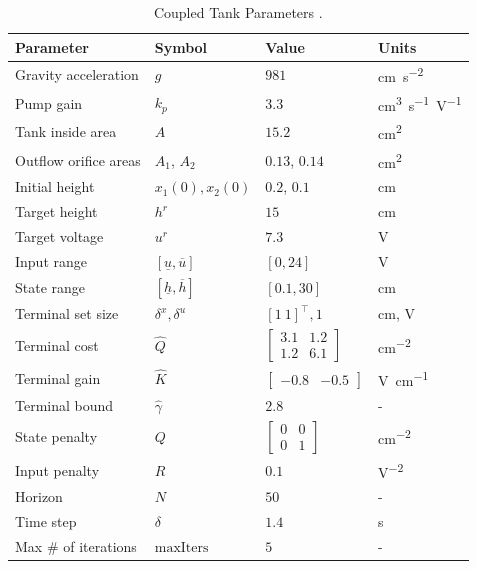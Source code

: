 \documentclass[a4paper, 10 pt, conference]{IEEEconf}
\begin{document}
\begin{table}[ht]
\centering
\def\strut{\rule{0pt}{7.5pt}}
\caption{Coupled Tank Parameters \cite{Quanser}.}
\label{tab:param}
\begin{tabular}{@{}llll@{\strut}}
\hline
\textbf{Parameter} & \textbf{Symbol} & \textbf{Value} & \textbf{Units} \\ \hline
Gravity acceleration     &    $g$    &   $981$    &    \si{cm.s^{-2}}   \\ \hline
Pump gain &   $k_p$     &    $3.3$   &    \si{cm^3 s^{-1} V^{-1}}   \\ \hline
Tank inside area &   $A$     &    $15.2$   &    \si{cm^2}   \\ \hline
Outflow orifice areas &   $A_1$, $A_2$     &    $0.13$, $0.14$   &    \si{cm^2}   \\ \hline
Initial height &   $x_1(0), x_2(0)$     &    $0.2$, $0.1$   &    \si{cm} \\ \hline
Target height &   $h^r$   &    $15$   &  \si{cm}  \\ \hline
Target voltage &   $u^r$   &    $7.3$   &  \si{V}  \\ \hline
Input range &   $[\underline{u}, \overline{u}]$   &   $\left[0, 24\right]$   &    \si{V}  \\ \hline
State range &   $[\underline{h}, \overline{h}]$   &   $\left[0.1, 30 \right]$   &    \si{cm}  \\ \hline
Terminal set size &   $\delta^x, \delta^u$   &   $[1 \ 1]^\top, 1$   &   \si{cm}, \si{V}  \\ \hline
Terminal cost &   $\hat{Q}$   &   $\begin{bmatrix} 3.1  & 1.2\\ 1.2  & 6.1 \end{bmatrix}$   &  \si{cm^{-2}}  \\ \hline
Terminal gain &   $\hat{K}$   &   $\begin{bmatrix} -0.8 & -0.5\end{bmatrix}$   &  \si{V cm^{-1}}  \\ \hline
Terminal bound &   $\hat{\gamma}$   &   $2.8$   &  \si{-}  \\ \hline
State penalty &   $Q$   &   $\begin{bmatrix} 0  & 0\\ 0  & 1 \end{bmatrix}$   &    \si{cm^{-2}}  \\ \hline
Input penalty &   $R$   &   $0.1$   &    \si{V^{-2}}  \\ \hline
Horizon &   $N$   &   $50$   &    \si{-}  \\ \hline
Time step &   $\delta$   &   $1.4$   &    \si{s}  \\ \hline
Max \# of iterations &   $\text{maxIters}$   &   $5$   &    \si{-}  \\ \hline
\end{tabular}
\vspace{-3mm}
\end{table}
\end{document}
